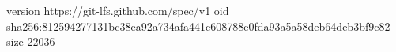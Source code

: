 version https://git-lfs.github.com/spec/v1
oid sha256:812594277131bc38ea92a734afa441c608788e0fda93a5a58deb64deb3bf9c82
size 22036
